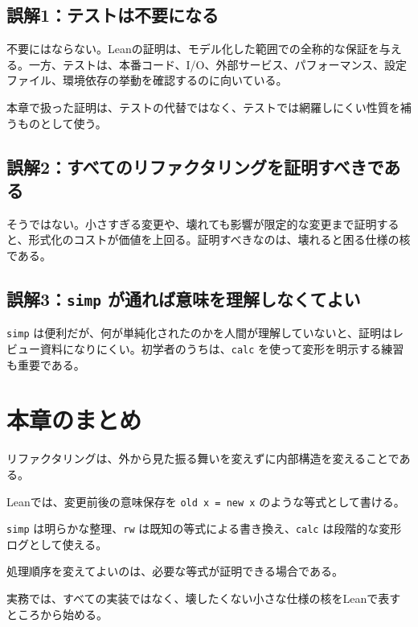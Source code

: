 \subsection{誤解1：テストは不要になる}

不要にはならない。Leanの証明は、モデル化した範囲での全称的な保証を与える。一方、テストは、本番コード、I/O、外部サービス、パフォーマンス、設定ファイル、環境依存の挙動を確認するのに向いている。

本章で扱った証明は、テストの代替ではなく、テストでは網羅しにくい性質を補うものとして使う。

\subsection{誤解2：すべてのリファクタリングを証明すべきである}

そうではない。小さすぎる変更や、壊れても影響が限定的な変更まで証明すると、形式化のコストが価値を上回る。証明すべきなのは、壊れると困る仕様の核である。

\subsection{誤解3：\texttt{simp} が通れば意味を理解しなくてよい}

\texttt{simp} は便利だが、何が単純化されたのかを人間が理解していないと、証明はレビュー資料になりにくい。初学者のうちは、\texttt{calc} を使って変形を明示する練習も重要である。

\section{本章のまとめ}

リファクタリングは、外から見た振る舞いを変えずに内部構造を変えることである。

Leanでは、変更前後の意味保存を \texttt{old x = new x} のような等式として書ける。

\texttt{simp} は明らかな整理、\texttt{rw} は既知の等式による書き換え、\texttt{calc} は段階的な変形ログとして使える。

処理順序を変えてよいのは、必要な等式が証明できる場合である。

実務では、すべての実装ではなく、壊したくない小さな仕様の核をLeanで表すところから始める。
